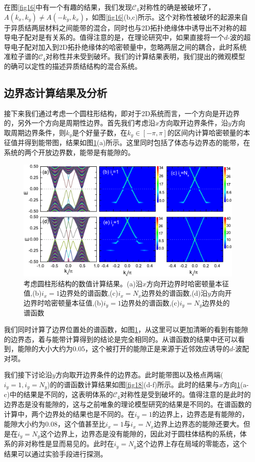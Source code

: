  在图\ref{fig16}中有一个有趣的结果，我们发现$\mathcal{C}_4$对称性的确是被破坏了，$A(k_x,k_y)\neq A(-k_y,k_x)$，如图\ref{fig16}(b,c)所示。这个对称性被破坏的起源来自于异质结两层材料之间能带的混合，同时也与2D拓扑绝缘体中诱导出不对称的超导电子配对是有关系的。值得注意的是，在理论研究中，如果直接将一个$d$-波的超导电子配对加入到2D拓扑绝缘体的哈密顿量中，忽略两层之间的耦合，此时系统准粒子谱的$\mathcal{C}_4$对称性并未受到破坏。我们的计算结果表明，我们提出的微观模型的确可以定性的描述异质结结构的混合系统。
\subsection{边界态计算结果及分析}
 接下来我们通过考虑一个圆柱形结构，即对于2D系统而言，一个方向是开边界的，另外一个方向是周期性边界。首先我们考虑沿$x$方向取开边界条件，沿$y$方向取周期边界条件，则$k_y$是个好量子数，在$k_y\in\left[-\pi,\pi\right]$的区间内计算哈密顿量的本征值并得到能带图，结果如图\ref{fig17}(a)所示。这里同时包括了体态与边界态的能带，在系统的两个开放边界数，能带是有能隙的。
\begin{figure}[h]
	\centering
	\includegraphics[scale=0.7]{pic/fig18.pdf}
	\caption{考虑圆柱形结构的数值计算结果。(a)沿$x$方向开边界时哈密顿量本征值,(b)$i_x=1$边界处的谱函数,(c)$i_x=N_x$边界处的谱函数,(d)沿$y$方向开边界时哈密顿量本征值,(b)$i_y=1$边界处的谱函数,(c)$i_y=N_y$边界处的谱函数}\label{fig17}
\end{figure}
我们同时计算了边界位置处的谱函数，如图\ref{fig17}，从这里可以更加清晰的看到有能隙的边界态，着与能带计算得到的结论是完全相同的。从谱函数的结果中还可以看到，能隙的大小大约为0.05，这个被打开的能隙正是来源于近邻效应诱导的$d$-波配对项。

 我们接下讨论沿$y$方向取开边界条件的边界态。此时能带图以及格点两端($i_y=1,i_y=N_y$)的的谱函数计算结果如图\ref{fig18}(d-f)所示。此时的结果与$x$方向\ref{fig17}(a-c)中的结果是不同的，这表明体系的$\mathcal{C}_4$对称性是受到破坏的。值得注意的是此时的边界态是没有能隙的，这与之前唯象的理论模型研究的结果是不同的\cite{re27,re28}。在谱函数的计算中，两个边界处的结果也是不同的。在$i_y=1$的边界上，边界态是有能隙的，能隙大小约为0.08，这个值甚至比$i_x=1$与$i_x=N_x$边界上边界态的能隙还要大。但是在$i_y=N_y$这个边界上，边界态是没有能隙的，因此对于圆柱体结构的系统，体系的非对称性是显而易见的。此时在$i_y=N_y$这个边界上存在局域的零能态，这个结果可以通过实验手段进行探测。
